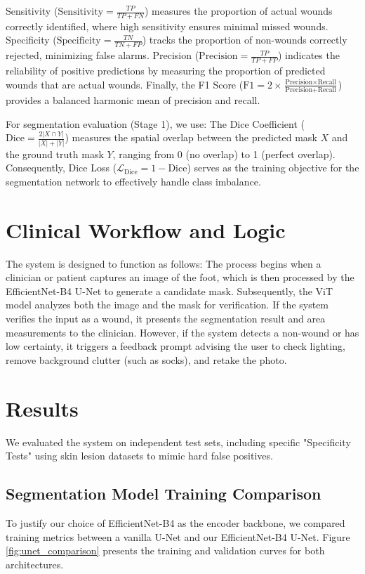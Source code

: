 \documentclass{article}
\begin{document}
Sensitivity ($\text{Sensitivity} = \frac{TP}{TP + FN}$) measures the proportion of actual wounds correctly identified, where high sensitivity ensures minimal missed wounds. Specificity ($\text{Specificity} = \frac{TN}{TN + FP}$) tracks the proportion of non-wounds correctly rejected, minimizing false alarms. Precision ($\text{Precision} = \frac{TP}{TP + FP}$) indicates the reliability of positive predictions by measuring the proportion of predicted wounds that are actual wounds. Finally, the F1 Score ($\text{F1} = 2 \times \frac{\text{Precision} \times \text{Recall}}{\text{Precision} + \text{Recall}}$) provides a balanced harmonic mean of precision and recall.

For segmentation evaluation (Stage 1), we use:
The Dice Coefficient ($\text{Dice} = \frac{2|X \cap Y|}{|X| + |Y|}$) measures the spatial overlap between the predicted mask $X$ and the ground truth mask $Y$, ranging from 0 (no overlap) to 1 (perfect overlap). Consequently, Dice Loss ($\mathcal{L}_{\text{Dice}} = 1 - \text{Dice}$) serves as the training objective for the segmentation network to effectively handle class imbalance.

\section{Clinical Workflow and Logic}
The system is designed to function as follows:
The process begins when a clinician or patient captures an image of the foot, which is then processed by the EfficientNet-B4 U-Net to generate a candidate mask. Subsequently, the ViT model analyzes both the image and the mask for verification. If the system verifies the input as a wound, it presents the segmentation result and area measurements to the clinician. However, if the system detects a non-wound or has low certainty, it triggers a feedback prompt advising the user to check lighting, remove background clutter (such as socks), and retake the photo.

\section{Results}

We evaluated the system on independent test sets, including specific "Specificity Tests" using skin lesion datasets to mimic hard false positives.

\subsection{Segmentation Model Training Comparison}
To justify our choice of EfficientNet-B4 as the encoder backbone, we compared training metrics between a vanilla U-Net and our EfficientNet-B4 U-Net. Figure \ref{fig:unet_comparison} presents the training and validation curves for both architectures.
\end{document}
